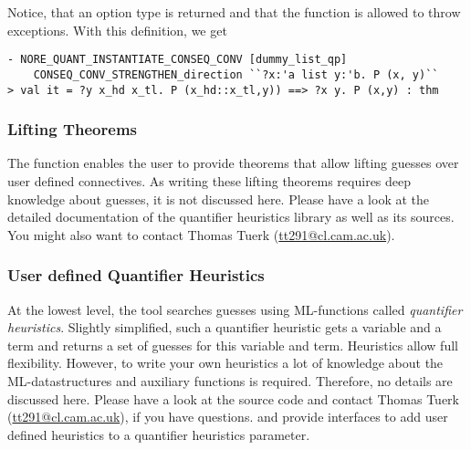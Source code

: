 \noindent
Notice, that an option type is returned and that the function is
allowed to throw  exceptions. 
With this definition, we get

\begin{session}
\begin{verbatim}
- NORE_QUANT_INSTANTIATE_CONSEQ_CONV [dummy_list_qp] 
    CONSEQ_CONV_STRENGTHEN_direction ``?x:'a list y:'b. P (x, y)``
> val it = ?y x_hd x_tl. P (x_hd::x_tl,y)) ==> ?x y. P (x,y) : thm
\end{verbatim} 
\end{session}

\subsubsection{Lifting Theorems}

The function  enables the
user to provide theorems that allow lifting guesses over
user defined connectives. As writing these lifting theorems requires
deep knowledge about guesses, it is not discussed here. Please have a
look at the detailed documentation of the quantifier heuristics library as
well as its sources. You might also want to contact
Thomas Tuerk (\url{tt291@cl.cam.ac.uk}).


\subsubsection{User defined Quantifier Heuristics}

At the lowest level, the tool searches guesses using ML-functions
called \emph{quantifier heuristics}. Slightly simplified, such a
quantifier heuristic gets a variable and a term and returns a set of
guesses for this variable and term. Heuristics allow full
flexibility. However, to write your own heuristics a lot of knowledge
about the ML-datastructures and auxiliary functions is
required. Therefore, no details are discussed here. Please have a look
at the source code and contact Thomas Tuerk
(\url{tt291@cl.cam.ac.uk}), if you have questions.
 and  provide
interfaces to add user defined heuristics to a quantifier heuristics
parameter.



